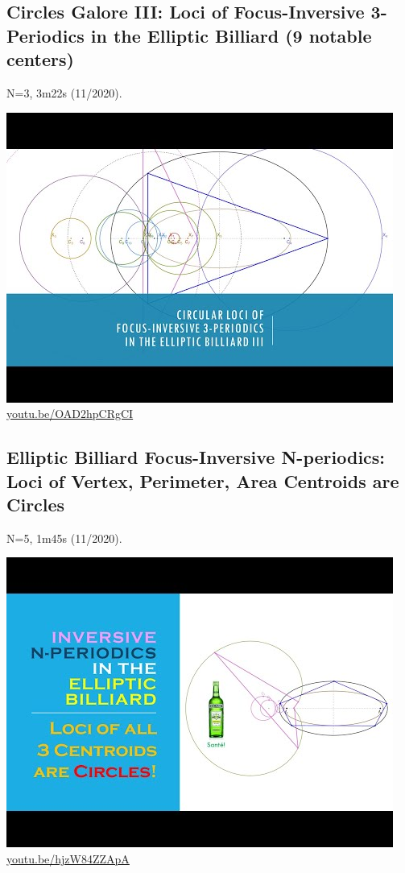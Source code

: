 \documentclass[12pt]{amsart}
\begin{document}
\subsection{Circles Galore III: Loci of Focus-Inversive 3-Periodics in the Elliptic Billiard (9 notable centers)}
\label{vid:OAD2hpCRgCI}
\noindent N=3, 3m22s (11/2020). 
\begin{center}\includegraphics[width=.5\textwidth]{pics/OAD2hpCRgCI.jpg} \\ 
\href{https://youtu.be/OAD2hpCRgCI}{\url{youtu.be/OAD2hpCRgCI}}\end{center}
% 
\subsection{Elliptic Billiard Focus-Inversive N-periodics: Loci of Vertex, Perimeter, Area Centroids are Circles}
\label{vid:hjzW84ZZApA}
\noindent N=5, 1m45s (11/2020). 
\begin{center}\includegraphics[width=.5\textwidth]{pics/hjzW84ZZApA.jpg} \\ 
\href{https://youtu.be/hjzW84ZZApA}{\url{youtu.be/hjzW84ZZApA}}\end{center}
% 
\end{document}

